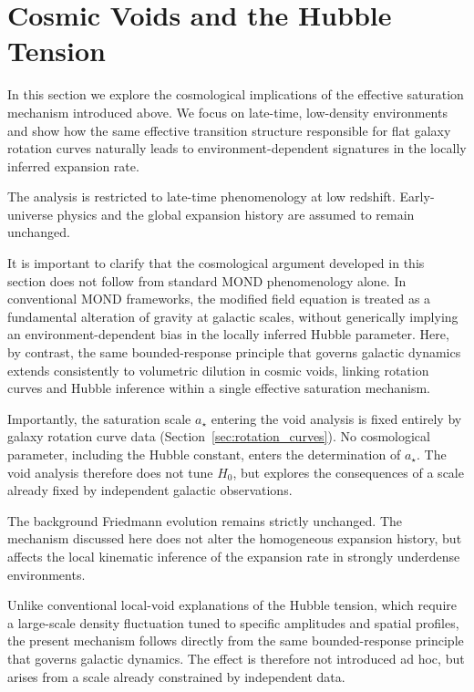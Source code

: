 \section{Cosmic Voids and the Hubble Tension}
  \label{sec:voids_hubble}

  In this section we explore the cosmological implications of the effective saturation mechanism introduced above.
  We focus on late-time, low-density environments and show how the same effective
  transition structure responsible for flat galaxy rotation curves naturally
  leads to environment-dependent signatures in the locally inferred expansion rate.

  The analysis is restricted to late-time phenomenology at low redshift.
  Early-universe physics and the global expansion history are assumed to remain unchanged.

  It is important to clarify that the cosmological argument developed
  in this section does not follow from standard MOND phenomenology alone.
  In conventional MOND frameworks, the modified field equation is
  treated as a fundamental alteration of gravity at galactic scales,
  without generically implying an environment-dependent bias in the locally inferred Hubble parameter.
  Here, by contrast, the same bounded-response principle that governs
  galactic dynamics extends consistently to volumetric dilution in
  cosmic voids, linking rotation curves and Hubble inference within a single effective saturation mechanism.

  Importantly, the saturation scale $a_\star$ entering the void analysis
  is fixed entirely by galaxy rotation curve data (Section~\ref{sec:rotation_curves}).
  No cosmological parameter, including the Hubble constant,
  enters the determination of $a_\star$.
  The void analysis therefore does not tune $H_0$,
  but explores the consequences of a scale already fixed
  by independent galactic observations.

  The background Friedmann evolution remains strictly unchanged.
  The mechanism discussed here does not alter the homogeneous expansion history,
  but affects the local kinematic inference of the expansion rate in
  strongly underdense environments.

  Unlike conventional local-void explanations of the Hubble tension,
  which require a large-scale density fluctuation tuned to specific
  amplitudes and spatial profiles, the present mechanism follows
  directly from the same bounded-response principle that governs
  galactic dynamics.
  The effect is therefore not introduced ad hoc,
  but arises from a scale already constrained by independent data.

  
  
  
  
  
  
  
  
